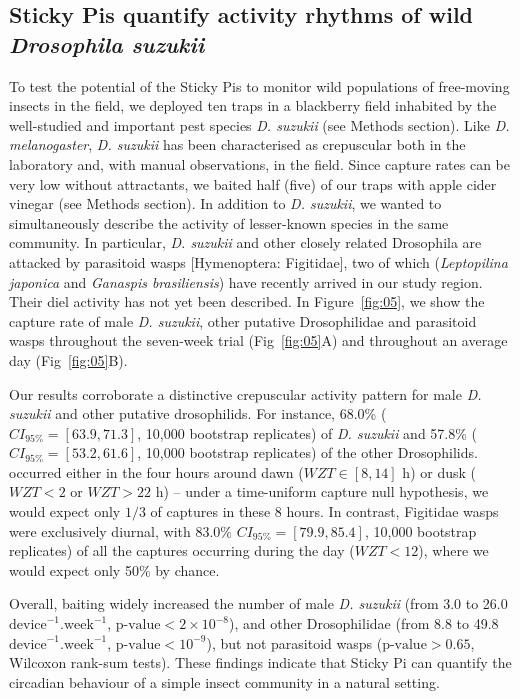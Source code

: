 \documentclass[12pt]{article}
\begin{document}
\begin{linenumbers}
		\subsection*{Sticky Pis quantify activity rhythms of wild \emph{Drosophila suzukii}}
		
		To test the potential of the Sticky Pis to monitor wild populations of free-moving insects in the field, we deployed ten traps in a blackberry field inhabited by the well-studied and important pest species \emph{D. suzukii} (see Methods section). Like \emph{D. melanogaster}, \emph{D. suzukii} has been characterised as crepuscular both in the laboratory\cite{shaw_control_2019} and, with manual observations, in the field\cite{swoboda-bhattarai_diurnal_2020}. Since capture rates can be very low without attractants\cite{swoboda-bhattarai_diurnal_2020}, we baited half (five) of our traps with apple cider vinegar (see Methods section). In addition to \emph{D. suzukii}, we wanted to simultaneously describe the activity of lesser-known species in the same community. In particular, \emph{D. suzukii} and other closely related Drosophila are attacked by parasitoid wasps [Hymenoptera: Figitidae], two of which (\emph{Leptopilina japonica} and \emph{Ganaspis brasiliensis}) have recently arrived in our study region\cite{abram_new_2020}. Their diel activity has not yet been described. In Figure~\ref{fig:05}, we show the capture rate of male \emph{D. suzukii}, other putative Drosophilidae and parasitoid wasps throughout the seven-week trial (Fig~\ref{fig:05}A) and throughout an average day (Fig~\ref{fig:05}B). 
		
		Our results corroborate a distinctive crepuscular activity pattern for male \emph{D. suzukii} and other putative drosophilids.
		For instance, 68.0\% ($CI_{95\%} =  [63.9, 71.3]$, 10,000 bootstrap replicates) of \emph{D. suzukii} and 
		57.8\% ($CI_{95\%} =  [53.2, 61.6]$, 10,000 bootstrap replicates) of the other Drosophilids.
		 occurred either in the four hours around dawn ($WZT \in [8, 14]$ h) or dusk ($WZT < 2$ or $WZT > 22$ h) -- under a time-uniform capture null hypothesis, we would expect only $1/3$ of captures in these 8 hours.
		In contrast, Figitidae wasps were exclusively diurnal, with 83.0\% $CI_{95\%} =  [79.9, 85.4]$, 10,000 bootstrap replicates) of all the captures occurring during the day ($WZT < 12$), where we would expect only 50\% by chance.		
		
		Overall, baiting widely increased the number of male \emph{D. suzukii} (from 3.0 to 26.0 $\text{device}^{-1}.\text{week}^{-1}$, $\text{p-value} < 2\times{}10^{-8}$), and other Drosophilidae (from 8.8 to 49.8 $\text{device}^{-1}.\text{week}^{-1}$, $\text{p-value} < 10^{-9}$), but not parasitoid wasps ($\text{p-value} > 0.65$, Wilcoxon rank-sum tests).
		These findings indicate that Sticky Pi can quantify the circadian behaviour of a simple insect community in a natural setting.
		

\end{linenumbers}
\end{document}
